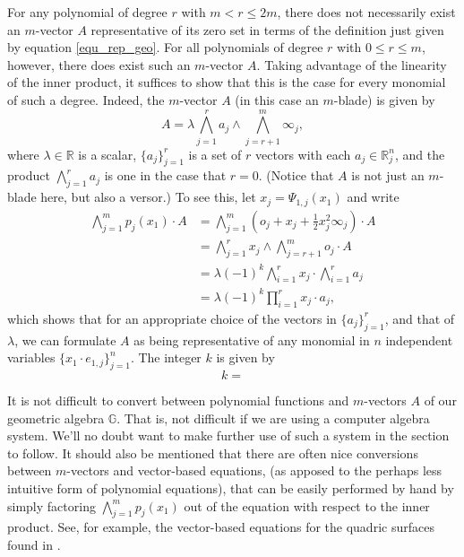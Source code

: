 \documentclass{ecgd-l}
\theoremstyle{definition}
\theoremstyle{remark}
\numberwithin{equation}{section}
\newcommand{\G}{\mathbb{G}}
\newcommand{\R}{\mathbb{R}}
\newcommand{\nvai}{\infty}
\newcommand{\nvao}{o}
\begin{document}
For any polynomial of degree $r$ with $m<r\leq 2m$, there does not necessarily exist an $m$-vector $A$ representative of its zero set in terms of the definition just given by
equation \eqref{equ_rep_geo}.  For all polynomials of degree $r$ with $0\leq r\leq m$,
however,
there does exist such an $m$-vector $A$.  Taking advantage of the linearity of the inner product,
it suffices to show that this is the case for every monomial of such a degree.  Indeed, the $m$-vector
$A$ (in this case an $m$-blade) is given by
\begin{equation*}
A = \lambda\bigwedge_{j=1}^r a_j\wedge\bigwedge_{j=r+1}^m\nvai_j,
\end{equation*}
where $\lambda\in\R$ is a scalar, $\{a_j\}_{j=1}^r$ is a set of $r$ vectors with
each $a_j\in\R^n_j$,
and the product $\bigwedge_{j=1}^r a_j$ is one in the case that $r=0$.
(Notice that $A$ is not just an $m$-blade here, but also a versor.)
To see this, let $x_j=\Psi_{1,j}(x_1)$ and write
\begin{align*}
\bigwedge_{j=1}^m p_j(x_1)\cdot A
 &= \bigwedge_{j=1}^m\left(\nvao_j+x_j+\frac{1}{2}x_j^2\nvai_j\right)\cdot A \\
 &= \bigwedge_{j=1}^r x_j\wedge\bigwedge_{j=r+1}^m\nvao_j\cdot A \\
 &= \lambda(-1)^k\bigwedge_{i=1}^r x_j \cdot\bigwedge_{i=1}^r a_j \\
 &= \lambda(-1)^k\prod_{i=1}^r x_j\cdot a_j,
\end{align*}
which shows that for an appropriate choice of the vectors in $\{a_j\}_{j=1}^r$,
and that of $\lambda$, we can formulate $A$ as being representative of any monomial in $n$
independent variables $\{x_1\cdot e_{1,j}\}_{j=1}^n$.  The integer $k$ is
given by
\begin{equation*}
k = 
\end{equation*}

It is not difficult to convert between polynomial functions and $m$-vectors $A$
of our geometric algebra $\G$.  That is, not difficult if we are using a computer
algebra system.  We'll no doubt want to make further
use of such a system in the section to follow.  It should also be mentioned
that there are often nice conversions between $m$-vectors and vector-based
equations, (as apposed to the perhaps less intuitive form of polynomial equations),
that can be easily performed by hand by simply factoring $\bigwedge_{j=1}^m p_j(x_1)$
out of the equation with respect to the inner product.
See, for example,
the vector-based equations for the quadric surfaces found in \cite{Miller87}.
\end{document}

